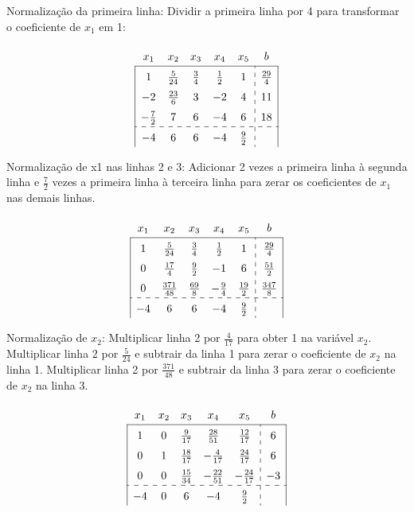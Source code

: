 \documentclass{article}
\begin{document}
Normalização da primeira linha: Dividir a primeira linha por 4 para transformar o coeficiente de $x_1$ em 1:

\[
\renewcommand{\arraystretch}{1.5}
\begin{array}{|ccccc:c|}
             x_1 &          x_2 &         x_3 &         x_4 & x_5 & b \\ \hline
               1 & \frac{5}{24} & \frac{3}{4} & \frac{1}{2} &   1 & \frac{29}{4} \\
    -          2 & \frac{23}{6} &           3 &          -2 &   4 & 11 \\
    -\frac{7}{2} & 7            &           6 &          -4 &   6 & 18 \\ \hdashline
              -4 & 6            &           6 &          -4 &  \frac{9}{2} &  
  \end{array}
\]

Normalização de x1 nas linhas 2 e 3: Adicionar 2 vezes a primeira linha à segunda linha e $\frac{7}{2}$ vezes a primeira linha à terceira linha para zerar os coeficientes de $x_1$ nas demais linhas.

\[
\renewcommand{\arraystretch}{1.5}
\begin{array}{|ccccc:c|}
  x_1 &          x_2 &         x_3 &         x_4 & x_5 & b \\ \hline
    1 & \frac{5}{24} & \frac{3}{4} & \frac{1}{2} & 1 & \frac{29}{4}\\
    0 & \frac{17}{4} & \frac{9}{2} & -1 & 6 & \frac{51}{2}\\
    0 & \frac{371}{48} & \frac{69}{8} & -\frac{9}{4} & \frac{19}{2} & \frac{347}{8} \\ \hdashline
   -4 & 6            &           6 &          -4 &  \frac{9}{2} &  
  \end{array}
\]

Normalização de $x_2$: Multiplicar linha 2 por $\frac{4}{17}$ para obter 1 na variável $x_2$.
Multiplicar linha 2 por $\frac{5}{24}$ e subtrair da linha 1 para zerar o coeficiente de $x_2$ na linha 1.
Multiplicar linha 2 por $\frac{371}{48}$ e subtrair da linha 3 para zerar o coeficiente de $x_2$ na linha 3.

\[
\renewcommand{\arraystretch}{1.5}
\begin{array}{|ccccc:c|}
  x_1 & x_2 &           x_3 &            x_4 &             x_5 &  b \\ \hline
    1 &   0 &  \frac{9}{17} &  \frac{28}{51} &   \frac{12}{17} &  6 \\
    0 &   1 & \frac{18}{17} &  -\frac{4}{17} &   \frac{24}{17} &  6 \\
    0 &   0 & \frac{15}{34} & -\frac{22}{51} &  -\frac{24}{17} & -3 \\ \hdashline
   -4 &   0 &             6 &             -4 &     \frac{9}{2} &  
  \end{array}
\]
\end{document}
